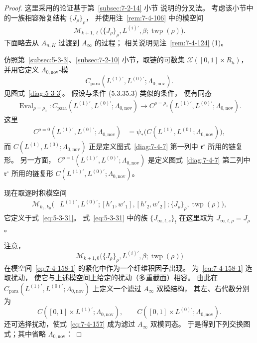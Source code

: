 \begin{proof}
这里采用的论证基于第~\ref{subsec:7-2-14} 小节
说明的分叉法。
考虑该小节中的一族相容殆复结构
$\{J_\rho\}_\rho$，
并使用注~\ref{rem:7-4-106} 中的模空间
\[
\mathcal M_{k+1,\ell}
\bigl(\{J_\rho\}_\rho,L^{(i)\prime},\beta;
\operatorname{twp}(\rho)\bigr).
\]
下面略去从 $A_{n,K}$ 过渡到 $A_\infty$ 的过程；
相关说明见注~\ref{rem:7-4-124} (1)。

仿照第~\ref{subsec:5-3-3}、\ref{subsec:7-2-10}
小节，取链的可数集
$\mathcal X([0,1]\times R_h)$，
并用它定义 $\Lambda_{0,\mathrm{nov}}$-模
\[
C_{\mathrm{para}}
(L^{(1)\prime},L^{(0)\prime};\Lambda_{0,\mathrm{nov}}).
\]
见图式~\ref{diag:5-3-3}。
假设与条件 (5.3.35.3) 类似的条件，
便有同态
\begin{equation}
\begin{aligned}
\operatorname{Eval}_{\rho=\rho_0}\colon
C_{\mathrm{para}}
(L^{(1)\prime},L^{(0)\prime};\Lambda_{0,\mathrm{nov}})
\longrightarrow
C^{\rho=\rho_0}
(L^{(1)\prime},L^{(0)\prime};\Lambda_{0,\mathrm{nov}}).
\end{aligned}
\tag{7.4.157}\label{eq:7-4-157}
\end{equation}
这里
\[
\begin{aligned}
C^{\rho=0}
(L^{(1)\prime},L^{(0)\prime};\Lambda_{0,\mathrm{nov}})
&=
\psi_*\bigl(
C(L^{(1)},L^{(0)};\Lambda_{0,\mathrm{nov}})
\bigr),
\end{aligned}
\]
而
$C(L^{(1)},L^{(0)};\Lambda_{0,\mathrm{nov}})$
正是定义图式~\ref{diag:7-4-7} 第一列中
$\mathfrak r^\circ$ 所用的链复形。
另一方面，
$C^{\rho=1}
(L^{(1)\prime},L^{(0)\prime};\Lambda_{0,\mathrm{nov}})$
是定义图式~\ref{diag:7-4-7} 第二列中
$\mathfrak r^\circ$ 所用的链复形
$C(L^{(1)\prime},L^{(0)\prime};\Lambda_{0,\mathrm{nov}})$。

现在取逐时积模空间
\begin{equation}
\begin{aligned}
\mathcal M_{k_1,k_0}
\bigl(&L^{(1)\prime},L^{(0)\prime};
[h'_1,w'_1],[h'_2,w'_2];
\{J_\rho\}_\rho,\operatorname{twp}(\rho)\bigr),
\end{aligned}
\tag{7.4.158.1}\label{eq:7-4-158-1}
\end{equation}
它定义于式~\eqref{eq:5-3-31}。
式~\eqref{eq:5-3-31} 中的族
$\{J_{\infty,t,s}\}_t$
在这里取为
$J_{\infty,t,\rho}=J_\rho$。

注意，
\[
\mathcal M_{k+1,0}
\bigl(\{J_\rho\}_\rho,L^{(i)\prime},\beta;
\operatorname{twp}(\rho)\bigr)
\]
在模空间~\eqref{eq:7-4-158-1}
的紧化中作为一个纤维积因子出现。
为~\eqref{eq:7-4-158-1} 选取扰动，
使它与上述模空间上给定的扰动（多重截面）相容。
由此在
$C_{\mathrm{para}}
(L^{(1)\prime},L^{(0)\prime};\Lambda_{0,\mathrm{nov}})$
上定义一个滤过 $A_\infty$ 双模结构，
其左、右代数分别为
\[
C([0,1]\times L^{(1)\prime};\Lambda_{0,\mathrm{nov}}),
\qquad
C([0,1]\times L^{(0)\prime};\Lambda_{0,\mathrm{nov}}).
\]
还可选择扰动，使式~\eqref{eq:7-4-157}
成为滤过 $A_\infty$ 双模同态。
于是得到下列交换图式；其中省略
$\Lambda_{0,\mathrm{nov}}$：


\end{proof}
